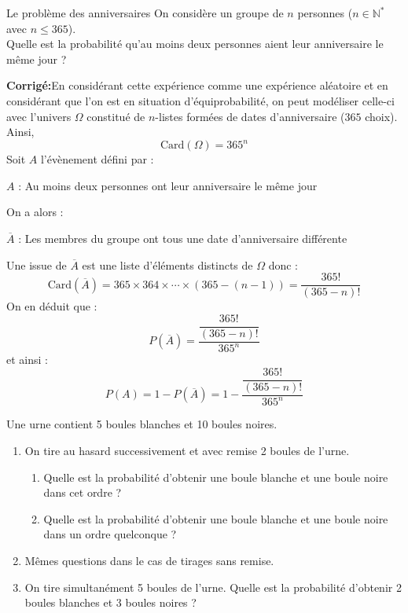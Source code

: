 \documentclass[a4paper,twoside,french,10pt]{VcCours}
\newcommand{\corr}{\textbf{Corrigé:}}
\begin{document}
\begin{Exercice}{Le problème des anniversaires}
On considère un groupe de $n$ personnes ($n \in \mathbb{N}^*$ avec $n \leq 365$).\\
Quelle est la probabilité qu'au moins deux personnes aient leur anniversaire le même jour ?
\end{Exercice}

\corr En considérant cette expérience comme une expérience aléatoire et en considérant que l'on est en situation d'équiprobabilité, on peut modéliser celle-ci avec l'univers $\Omega$ constitué de $n$-listes formées de dates d'anniversaire ($365$ choix). Ainsi,
$$ \textrm{Card}(\Omega) = 365^n$$
Soit $A$ l'évènement défini par :

\begin{center}
$A$ : \og Au moins deux personnes ont leur anniversaire le même jour \fg{} 
\end{center}
On a alors :
\begin{center}
$\overline{A}$ : \og Les membres du groupe ont tous une date d'anniversaire différente \fg{} 
\end{center}
Une issue de $\overline{A}$ est une liste d'éléments distincts de $\Omega$ donc :
$$ \textrm{Card}(\overline{A}) = 365 \times 364 \times \cdots \times (365-(n-1)) = \dfrac{365!}{(365-n)!}$$
On en déduit que :
$$ P(\overline{A}) = \dfrac{\dfrac{365!}{(365-n)!}}{365^n}$$
et ainsi :
$$ P(A) = 1- P(\overline{A}) = 1 - \dfrac{\dfrac{365!}{(365-n)!}}{365^n}$$


\begin{Exercice}{} Une urne contient 5 boules blanches et 10 boules noires.

\begin{enumerate}
\item On tire au hasard successivement et avec remise 2 boules de l'urne.
\begin{enumerate}
\item Quelle est la probabilité d'obtenir une boule blanche et une boule noire dans cet ordre ?
\item Quelle est la probabilité d'obtenir une boule blanche et une boule noire dans un ordre quelconque ?
\end{enumerate}
\item Mêmes questions dans le cas de tirages sans remise.
\item On tire simultanément 5 boules de l'urne. Quelle est la probabilité d'obtenir 2 boules blanches et 3 boules noires ?
\end{enumerate}
\end{Exercice}
\end{document}
